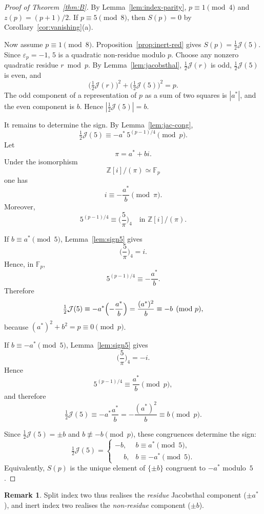 \documentclass[11pt]{amsart}
\theoremstyle{plain}
\theoremstyle{definition}
\newtheorem{remark}[theorem]{Remark}
\newcommand{\Jac}{\mathcal{J}}
\begin{document}
\begin{proof}[Proof of Theorem~\ref{thm:B}]
By Lemma~\ref{lem:index-parity}, $p\equiv1\pmod4$ and $z(p)=(p+1)/2$.
If $p\equiv5\pmod8$, then $S(p)=0$ by Corollary~\ref{cor:vanishing}(a).

Now assume $p\equiv1\pmod8$. Proposition~\ref{prop:inert-red} gives
$S(p)=\tfrac12\Jac(5)$. Since $\varepsilon_p=-1$, $5$ is a quadratic
non-residue modulo $p$. Choose any nonzero quadratic residue $r\bmod p$.
By Lemma~\ref{lem:jacobsthal}, $\tfrac12\Jac(r)$ is odd,
$\tfrac12\Jac(5)$ is even, and
\[
  \bigl(\tfrac12\Jac(r)\bigr)^2+\bigl(\tfrac12\Jac(5)\bigr)^2=p.
\]
The odd component of a representation of $p$ as a sum of two squares is
$|a^{*}|$, and the even component is $b$. Hence
$|\tfrac12\Jac(5)|=b$.

It remains to determine the sign. By Lemma~\ref{lem:jac-cong},
\[
  \tfrac12\Jac(5)\equiv -a^{*}\,5^{(p-1)/4}\pmod p.
\]
Let
\[
  \pi=a^{*}+bi.
\]
Under the isomorphism
\[
  \mathbb Z[i]/(\pi)\simeq\mathbb F_p
\]
one has
\[
  i\equiv -\frac{a^{*}}{b}\pmod\pi.
\]
Moreover,
\[
  5^{(p-1)/4}\equiv
  \biggl(\frac{5}{\pi}\biggr)_{\!4}
  \quad\text{in }\mathbb Z[i]/(\pi).
\]

If $b\equiv a^{*}\pmod5$, Lemma~\ref{lem:sign5} gives
\[
  \biggl(\frac{5}{\pi}\biggr)_{\!4}=i.
\]
Hence, in $\mathbb F_p$,
\[
  5^{(p-1)/4}\equiv -\frac{a^{*}}{b}.
\]
Therefore
\[
  \tfrac12\Jac(5)
  \equiv
  -a^{*}\Bigl(-\frac{a^{*}}{b}\Bigr)
  =
  \frac{(a^{*})^2}{b}
  \equiv
  -b
  \pmod p,
\]
because $(a^{*})^2+b^2=p\equiv0\pmod p$.

If $b\equiv -a^{*}\pmod5$, Lemma~\ref{lem:sign5} gives
\[
  \biggl(\frac{5}{\pi}\biggr)_{\!4}=-i.
\]
Hence
\[
  5^{(p-1)/4}\equiv \frac{a^{*}}{b}\pmod p,
\]
and therefore
\[
  \tfrac12\Jac(5)
  \equiv
  -a^{*}\frac{a^{*}}{b}
  =
  -\frac{(a^{*})^2}{b}
  \equiv
  b
  \pmod p.
\]

Since $\tfrac12\Jac(5)=\pm b$ and $b\not\equiv -b\pmod p$, these congruences
determine the sign:
\[
  \tfrac12\Jac(5)
  =
  \begin{cases}
    -b,& b\equiv a^{*}\pmod5,\\
    \phantom{-}b,& b\equiv -a^{*}\pmod5.
  \end{cases}
\]
Equivalently, $S(p)$ is the unique element of $\{\pm b\}$ congruent to
$-a^{*}$ modulo~$5$.
\end{proof}

\begin{remark}
Split index two thus realises the \emph{residue} Jacobsthal component ($\pm a^{*}$),
and inert index two realises the \emph{non-residue} component ($\pm b$).
\end{remark}
\end{document}
